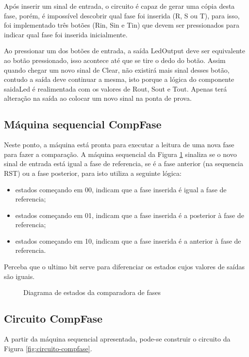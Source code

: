 \documentclass[12pt,a4paper,openany]{abntex2}
\begin{document}
Após inserir um sinal de entrada, o circuito é capaz de gerar uma cópia desta fase, porém, é impossível descobrir qual fase foi inserida (R, S ou T), para isso, foi implementado três botões (Rin, Sin e Tin) que devem ser pressionados para indicar qual fase foi inserida inicialmente.

Ao pressionar um dos botões de entrada, a saída LedOutput deve ser equivalente ao botão pressionado, isso acontece até que se tire o dedo do botão. Assim quando chegar um novo sinal de Clear, não existirá mais sinal desses botão, contudo a saída deve continuar a mesma, isto porque a lógica do componente saidaLed é realimentada com os valores de Rout, Sout e Tout. Apenas terá alteração na saída ao colocar um novo sinal na ponta de prova.

\subsection{Máquina sequencial CompFase}

Neste ponto, a máquina está pronta para executar a leitura de uma nova fase para fazer a comparação. A máquina sequencial da Figura \ref{fig:comp-fase} sinaliza se o novo sinal de entrada está igual a fase de referencia, se é a fase anterior (na sequencia RST) ou a fase posterior, para isto utiliza a seguinte lógica:
\begin{itemize}
	\item estados começando em 00, indicam que a fase inserida é igual a fase de referencia;
	\item estados começando em 01, indicam que a fase inserida é a posterior à fase de referencia;
	\item estados começando em 10, indicam que a fase inserida é a anterior à fase de referencia.
\end{itemize}

Perceba que o ultimo bit serve para diferenciar os estados cujos valores de saídas são iguais.

\begin{figure}[!htp]
	\centering
	\caption{Diagrama de estados da comparadora de fases}
	\label{fig:comp-fase}
\end{figure}

\subsection{Circuito CompFase}

A partir da máquina sequencial apresentada, pode-se construir o circuito da Figura \ref{fig:circuito-compfase}.
\end{document}
